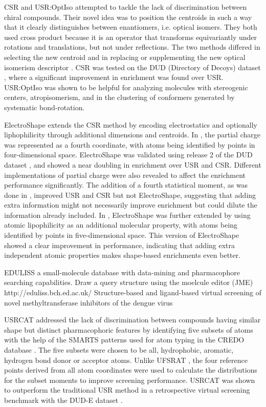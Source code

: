 CSR \citep{1334} and USR:OptIso \citep{1335} attempted to tackle the lack of discrimination between chiral compounds. Their novel idea was to position the centroids in such a way that it clearly distinguishes between enantiomers, i.e. optical isomers. They both used cross product because it is an operator that transforms equivariantly under rotations and translations, but not under reflections. The two methods differed in selecting the new centroid and in replacing or supplementing the new optical isomerism descriptor \citep{1335}. CSR \citep{1334} was tested on the DUD (Directory of Decoys) dataset \citep{87}, where a significant improvement in enrichment was found over USR. USR:OptIso \citep{1335} was shown to be helpful for analyzing molecules with stereogenic centers, atropisomerism, and in the clustering of conformers generated by systematic bond-rotation.

ElectroShape \citep{1337,1338} extends the CSR method by encoding electrostatics and optionally liphophilicity through additional dimensions and centroids. In \citep{1337}, the partial charge was represented as a fourth coordinate, with atoms being identified by points in four-dimensional space. ElectroShape was validated using release 2 of the DUD dataset \citep{87}, and showed a near doubling in enrichment over USR and CSR. Different implementations of partial charge were also revealed to affect the enrichment performance significantly. The addition of a fourth statistical moment, as was done in \citep{1333}, improved USR and CSR but not ElectroShape, suggesting that adding extra information might not necessarily improve enrichment but could dilute the information already included. In \citep{1338}, ElectroShape was further extended by using atomic lipophilicity as an additional molecular property, with atoms being identified by points in five-dimensional space. This version of ElectroShape showed a clear improvement in performance, indicating that adding extra independent atomic properties makes shape-based enrichments even better.

\citep{1437} EDULISS a small-molecule database with data-mining and pharmacophore searching capabilities. Draw a query structure using the moelcule editor (JME) http://eduliss.bch.ed.ac.uk/
\citep{1435} Structure-based and ligand-based virtual screening of novel methyltransferase inhibitors of the dengue virus

USRCAT \citep{1331} addressed the lack of discrimination between compounds having similar shape but distinct pharmacophoric
features by identifying five subsets of atoms with the help of the SMARTS patterns used for atom typing in the CREDO database \citep{522}. The five subsets were chosen to be all, hydrophobic, aromatic, hydrogen bond donor or acceptor atoms. Unlike UFSRAT \citep{1436}, the four reference points derived from all atom coordinates were used to calculate the distributions for the subset moments to improve screening performance. USRCAT was shown to outperform the traditional USR method in a retrospective virtual screening benchmark with the DUD-E dataset \citep{1185}.

